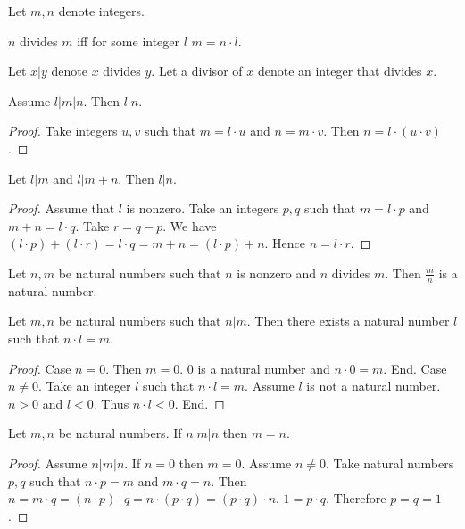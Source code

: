 \documentclass{article}
\begin{document}
\begin{forthel}

Let $m,n$ denote integers.

\begin{definition}
$n$ divides $m$ iff for some integer $l$ $m = n \cdot l$.
\end{definition}

Let $x | y$ denote $x$ divides $y$.
Let a divisor of $x$ denote an integer that divides $x$.

\begin{lemma}
Assume $l | m | n$.
Then $l | n$.
\end{lemma}
\begin{proof}
Take integers $u,v$ such that 
$m = l \cdot u$ and $n = m \cdot v$.
Then $n = l \cdot (u \cdot v)$.
\end{proof}

\begin{lemma}
Let $l | m$ and $l | m + n$.
Then $l | n$.
\end{lemma}
\begin{proof}
Assume that $l$ is nonzero.
Take an integers $p,q$ such that $m = l \cdot p$ and $m + n = l \cdot q$.
Take $r = q - p$.
We have 
$(l \cdot p) + (l \cdot r) = l \cdot q = m + n = (l \cdot p) + n$.
Hence $n = l \cdot r$.
\end{proof}

\begin{lemma}
Let $n,m$ be natural numbers such that $n$ is nonzero and $n$ divides $m$.
Then $\frac{m}{n}$ is a natural number.
\end{lemma}

\begin{lemma}
Let $m,n$ be natural numbers such that $n | m$.
Then there exists a natural number $l$ such that $n \cdot l = m$.
\end{lemma}
\begin{proof}
Case $n = 0$. Then $m = 0$. $0$ is a natural number and $n \cdot 0 = m$. End.
Case $n \neq 0$.
Take an integer $l$ such that $n \cdot l = m$.
Assume $l$ is not a natural number.
$n > 0$ and $l < 0$. Thus $n \cdot l < 0$. End.
\end{proof}

\begin{lemma}
Let $m,n$ be natural numbers.
If $n | m | n$ then $m=n$.
\end{lemma}
\begin{proof}
Assume $n | m | n$.
If $n = 0$ then $m = 0$. Assume $n \neq 0$.
Take natural numbers $p,q$ such that $n \cdot p = m$ and $m \cdot q = n$.
Then $n = m \cdot q = (n \cdot p) \cdot q = n \cdot (p \cdot q) = (p \cdot q) \cdot n$. $1 = p \cdot q$. Therefore $p=q=1$.
\end{proof}


\end{forthel}
\end{document}
